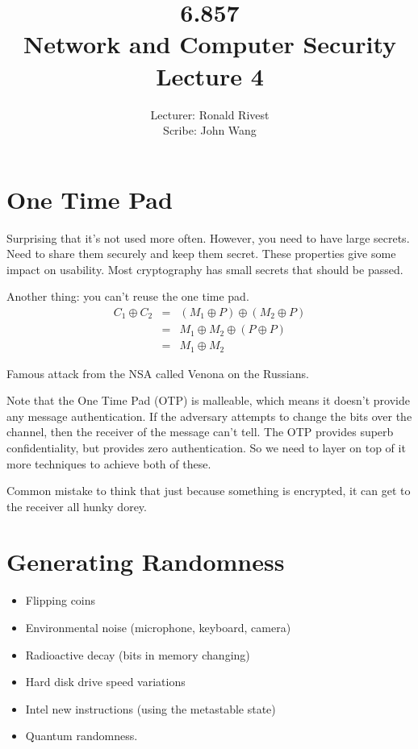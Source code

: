 \documentclass[psamsfonts]{amsart}
\title{6.857 \\
Network and Computer Security \\
Lecture 4}
\author{Lecturer: Ronald Rivest\\
Scribe: John Wang}
\begin{document}
\maketitle

\section{One Time Pad}

Surprising that it's not used more often. However, you need to have large secrets. Need to share them securely and keep them secret. These properties give some impact on usability. Most cryptography has small secrets that should be passed. 

Another thing: you can't reuse the one time pad. 
\begin{eqnarray}
C_1 \oplus C_2 &=& (M_1 \oplus P) \oplus (M_2 \oplus P) \\
 &=& M_1 \oplus M_2 \oplus (P \oplus P) \\
 &=& M_1 \oplus M_2
\end{eqnarray}

Famous attack from the NSA called Venona on the Russians. 

Note that the One Time Pad (OTP) is malleable, which means it doesn't provide any message authentication. If the adversary attempts to change the bits over the channel, then the receiver of the message can't tell. The OTP provides superb confidentiality, but provides zero authentication. So we need to layer on top of it more techniques to achieve both of these.

Common mistake to think that just because something is encrypted, it can get to the receiver all hunky dorey.

\section{Generating Randomness}

\begin{itemize}
\item Flipping coins
\item Environmental noise (microphone, keyboard, camera)
\item Radioactive decay (bits in memory changing)
\item Hard disk drive speed variations
\item Intel new instructions (using the metastable state)
\item Quantum randomness.
\end{itemize}
\end{document}
